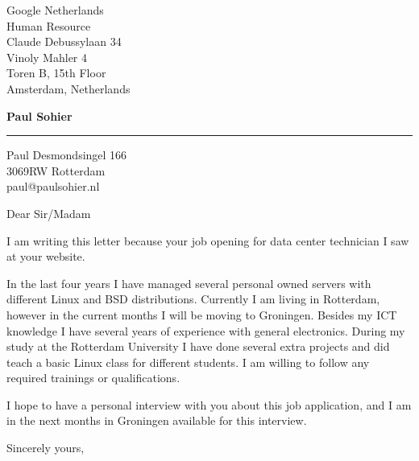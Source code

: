 \documentclass{letter} %
\begin{document}
\signature{Paul Sohier}           %
\longindentation=0pt                       %
\let\raggedleft\raggedright                %
 
 
\begin{letter}{Google Netherlands\\
Human Resource \\
Claude Debussylaan 34 \\
Vinoly Mahler 4 \\
Toren B, 15th Floor \\
Amsterdam, Netherlands \\
}

\begin{center}
{\large\bf Paul Sohier} 
\end{center}
\medskip\hrule height 1pt
\begin{center}
{Paul Desmondsingel 166 \\   3069RW Rotterdam \\ paul@paulsohier.nl}
\end{center} \vfill %
 
 
\opening{Dear Sir/Madam} 
 
\noindent 
I am writing this letter because your job opening for data center technician I saw at your website. 

\noindent
In the last four years I have managed several personal owned servers with different Linux and BSD distributions. Currently I am living in Rotterdam, however in the current months I will be moving to Groningen. Besides my ICT knowledge I have several years of experience with general electronics. During my study at the Rotterdam University I have done several extra projects and did teach a basic Linux class for different students. I am willing to follow any required trainings or qualifications.
 
I hope to have a personal interview with you about this job application, and I am in the next months in Groningen available for this interview.
 
\closing{Sincerely yours,} 
 

 
\encl{}					%

\end{letter}
 
\end{document}
